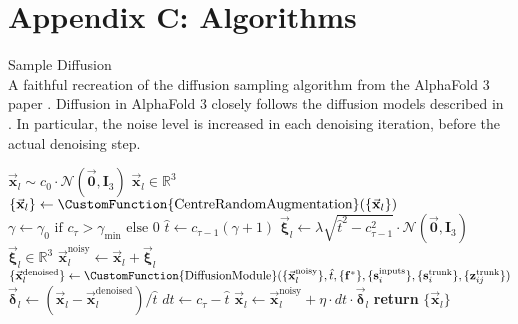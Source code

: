 \section*{Appendix C: Algorithms}
\begin{suppalgorithm}
     \caption{Sample Diffusion\\ A faithful recreation of the diffusion sampling algorithm from the AlphaFold 3 paper \cite{af3}. Diffusion in AlphaFold 3 closely follows the diffusion models described in \cite{edm_diffusion}. In particular, the noise level is increased in each denoising iteration, before the actual denoising step. }
     {\small
     \begin{algorithmic}[1]
         \State $\vec{\mathbf{x}}_l \sim c_0 \cdot \mathcal{N}(\vec{\mathbf{0}}, \mathbf{I}_3)$ \hfill $\vec{\mathbf{x}}_l \in \mathbb{R}^3$
             \State $\{\vec{\mathbf{x}}_l\} \gets \CustomFunction{\text{CentreRandomAugmentation}}(\{\vec{\mathbf{x}}_l\})$
             \State $\gamma \gets \gamma_0 \text{ if } c_\tau > \gamma_{\min} \text{ else } 0$
             \State $\hat{t} \gets c_{\tau-1}(\gamma + 1)$
             \State $\vec{\boldsymbol{\xi}}_l \gets \lambda \sqrt{\hat{t}^2 - c_{\tau-1}^2} \cdot \mathcal{N}(\vec{\mathbf{0}}, \mathbf{I}_3)$ \hfill $\vec{\boldsymbol{\xi}}_l \in \mathbb{R}^3$
             \State $\vec{\mathbf{x}}_l^{\text{noisy}} \gets \vec{\mathbf{x}}_l + \vec{\boldsymbol{\xi}}_l$
             \State $\{\vec{\mathbf{x}}_l^{\text{denoised}}\} \gets \CustomFunction{\text{DiffusionModule}}(\{\vec{\mathbf{x}}_l^{\text{noisy}}\}, \hat{t}, \{\mathbf{f}^*\}, \{\mathbf{s}_i^{\text{inputs}}\}, \{\mathbf{s}_i^{\text{trunk}}\}, \{\mathbf{z}_{ij}^{\text{trunk}}\})$
             \State $\vec{\boldsymbol{\delta}}_l \gets (\vec{\mathbf{x}}_l - \vec{\mathbf{x}}_l^{\text{denoised}})/\hat{t}$
             \State $dt \gets c_\tau - \hat{t}$
             \State $\vec{\mathbf{x}}_l \gets \vec{\mathbf{x}}_l^{\text{noisy}} + \eta \cdot dt \cdot \vec{\boldsymbol{\delta}}_l$
         \EndFor
         \State \textbf{return} $\{\vec{\mathbf{x}}_l\}$
         \end{algorithmic}
     }
     \label{alg:af3_diffusion}
\end{suppalgorithm}

